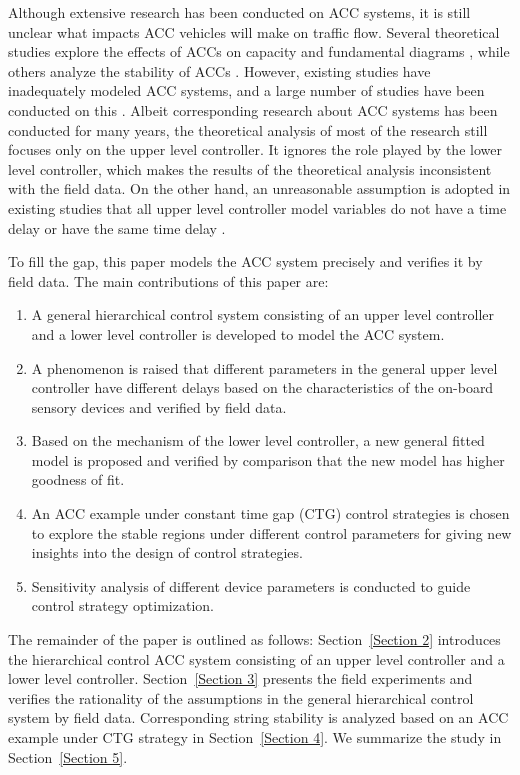 \documentclass[a4paper]{cas-sc}
\begin{document}
Although extensive research has been conducted on ACC systems, it is still unclear what impacts ACC vehicles will make on traffic flow. Several theoretical studies explore the effects of ACCs on capacity and fundamental diagrams \citep{Shang2021,Li2022,Ciuffo2021}, while others analyze the stability of ACCs \citep{Flores2018,Lee2021,Zhou2017}. However, existing studies have inadequately modeled ACC systems, and a large number of studies have been conducted on this \citep{Gunter2019,Shang2022,Milanes2014}. Albeit corresponding research about ACC systems has been conducted for many years, the theoretical analysis of most of the research still focuses only on the upper level controller. It ignores the role played by the lower level controller, which makes the results of the theoretical analysis inconsistent with the field data. On the other hand, an unreasonable assumption is adopted in existing studies that all upper level controller model variables do not have a time delay or have the same time delay \citep{Ngoduy2013,Zhou2019}.

To fill the gap, this paper models the ACC system precisely and verifies it by field data. The main contributions of this paper are:

\begin{enumerate}
  \item A general hierarchical control system consisting of an upper level controller and a lower level controller is developed to model the ACC system.
  \item A phenomenon is raised that different parameters in the general upper level controller have different delays based on the characteristics of the on-board sensory devices and verified by field data.
  \item Based on the mechanism of the lower level controller, a new general fitted model is proposed and verified by comparison that the new model has higher goodness of fit.
  \item An ACC example under constant time gap (CTG) control strategies is chosen to explore the stable regions under different control parameters for giving new insights into the design of control strategies.
  \item Sensitivity analysis of different device parameters is conducted to guide control strategy optimization.
\end{enumerate}

The remainder of the paper is outlined as follows: Section~\ref{Section 2} introduces the hierarchical control ACC system consisting of an upper level controller and a lower level controller. Section~\ref{Section 3} presents the field experiments and verifies the rationality of the assumptions in the general hierarchical control system by field data. Corresponding string stability is analyzed based on an ACC example under CTG strategy in Section~\ref{Section 4}. We summarize the study in Section~\ref{Section 5}.
\end{document}
